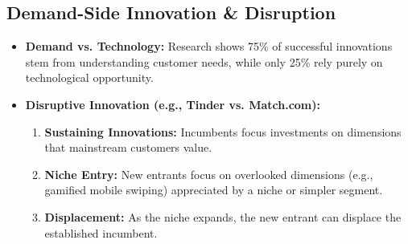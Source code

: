 \subsection*{Demand-Side Innovation \& Disruption}
\begin{itemize}
    \item \textbf{Demand vs. Technology:} Research shows 75\% of successful innovations stem from
          understanding customer needs, while only 25\% rely purely on technological
          opportunity.
    \item \textbf{Disruptive Innovation (e.g., Tinder vs. Match.com):}
          \begin{enumerate}
              \item \textbf{Sustaining Innovations:} Incumbents focus investments on dimensions that
                    mainstream customers value.
              \item \textbf{Niche Entry:} New entrants focus on overlooked dimensions (e.g., gamified
                    mobile swiping) appreciated by a niche or simpler segment.
              \item \textbf{Displacement:} As the niche expands, the new entrant can displace the
                    established incumbent.
          \end{enumerate}
\end{itemize}